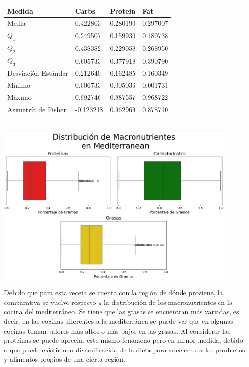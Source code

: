 \documentclass[12pt,a4paper]{article}
\begin{document}
{{            \begin{center}
                \begin{tabular}{l|lll}
                    \toprule
                        Medida & Carbs & Protein & Fat \\
                    \midrule
                        Media               & 0.422803 & 0.280190 & 0.297007 \\
                        $Q_1$               & 0.249507 & 0.159930 & 0.180738 \\
                        $Q_2$               & 0.438382 & 0.229058 & 0.268950 \\
                        $Q_3$               & 0.605733 & 0.377918 & 0.390790 \\
                        Desviación Estándar & 0.212640 & 0.162485 & 0.160349 \\
                        Mínimo              & 0.006733 & 0.005036 & 0.001731 \\
                        Máximo              & 0.992746 & 0.887557 & 0.968722 \\
                        Asimetría de Fisher & -0.123218 & 0.962969 & 0.878710 \\
                    \bottomrule
                \end{tabular}\\
                \vspace{0.5cm}
                \includegraphics[width=0.9\textwidth]{Resources/EDA/Mediterranean_1.png}
            \end{center}       

            Debido que para esta receta se cuenta con la región de dónde proviene, la 
            comparativa se vuelve respecto a la distribución de los macronutrientes en 
            la cocina del mediterráneo. Se tiene que las grasas se encuentran más variadas, 
            es decir, en las cocinas diferentes a la mediterránea se puede ver que en 
            algunas cocinas toman valores más altos o más bajos en las grasas. Al considerar 
            las proteínas se puede apreciar este mismo fenómeno pero en menor medida, debido 
            a que puede existir una diversificación de la dieta para adecuarse a los 
            productos y alimentos propios de una cierta región.

}}
\end{document}
